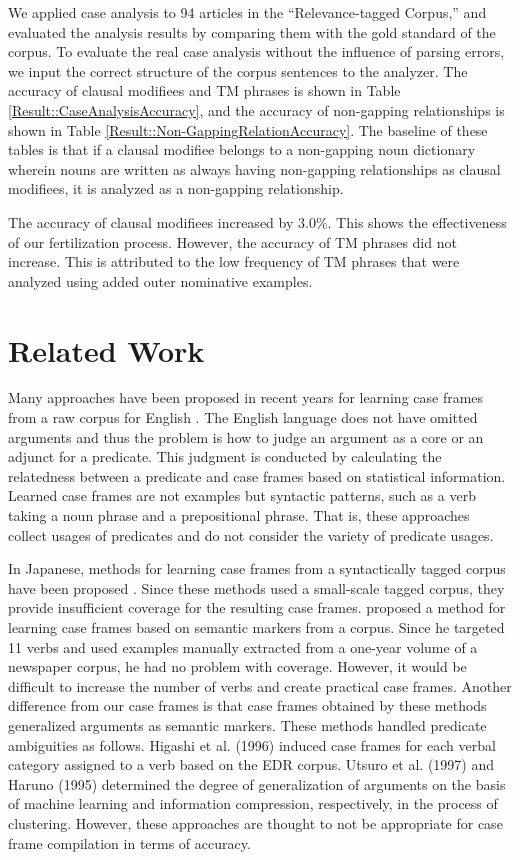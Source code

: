 \documentclass[english]{jnlp_1.4_rep}
\begin{document}
We applied case analysis to 94 articles in the ``Relevance-tagged
Corpus,'' and evaluated the analysis results by comparing them with the
gold standard of the corpus. To evaluate the real case analysis without
the influence of parsing errors, we input the correct structure of the
corpus sentences to the analyzer.  The accuracy of clausal modifiees and
TM phrases is shown in Table \ref{Result::CaseAnalysisAccuracy}, and the
accuracy of non-gapping relationships is shown in Table
\ref{Result::Non-GappingRelationAccuracy}. The baseline of these tables
is that if a clausal modifiee belongs to a non-gapping noun dictionary
wherein nouns are written as always having non-gapping relationships as
clausal modifiees, it is analyzed as a non-gapping relationship.

The accuracy of clausal modifiees increased by 3.0\%. This shows
the effectiveness of our fertilization process. However, the accuracy of TM
phrases did not increase. This is attributed to the low frequency of 
TM phrases that were analyzed using added outer nominative examples.


\section{Related Work}

Many approaches have been proposed in recent years for learning case
frames from a raw corpus for English \cite{Brent1993,Ushioda1993,Manning1993,Briscoe1997,Korhonen2003}.
The English language does not have omitted arguments and thus the
problem is how to judge an argument as a core or an adjunct for a predicate.
This judgment is conducted by calculating the relatedness between a
predicate and case frames based on statistical information. Learned case
frames are not examples but syntactic patterns, such as a verb taking a
noun phrase and a prepositional phrase. That is, these approaches
collect usages of predicates and do not consider the variety of
predicate usages.

In Japanese, methods for learning case frames from a syntactically
tagged corpus have been proposed \cite{Higashi1996,Utsuro1997}. Since
these methods used a small-scale tagged corpus, they provide
insufficient coverage for the resulting case frames.  proposed a method
for learning case frames based on semantic markers from a corpus. 
Since he targeted 11 verbs and used examples
manually extracted from a one-year volume of a newspaper corpus, he
had no problem with coverage. However, it would be difficult to
increase the number of verbs and create practical case frames. Another
difference from our case frames is that case frames obtained by
these methods generalized arguments as semantic markers. These methods
handled predicate ambiguities as follows. Higashi et al. (1996) induced case
frames for each verbal category assigned to a verb based on the EDR corpus.
Utsuro et al. (1997) and Haruno (1995) determined the degree of generalization
of arguments on the basis of machine learning and information
compression, respectively, in the process of clustering. However, these
approaches are thought to not be appropriate for case frame compilation
in terms of accuracy.
\end{document}
